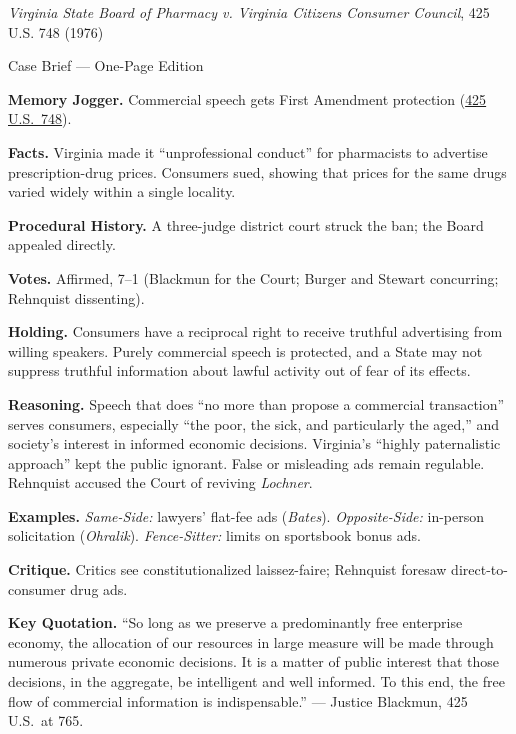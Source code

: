 \documentclass[12pt]{article}
\begin{document}
\begin{center}
{\Large \textit{Virginia State Board of Pharmacy v. Virginia Citizens Consumer Council}, 425 U.S. 748 (1976)\par}
\vspace{0.3em}
{\normalsize Case Brief --- One-Page Edition\par}
\end{center}

\textbf{Memory Jogger.} Commercial speech gets First Amendment protection (\href{https://supreme.justia.com/cases/federal/us/425/748/}{425 U.S.\ 748}).

\textbf{Facts.} Virginia made it ``unprofessional conduct'' for pharmacists to advertise prescription-drug prices. Consumers sued, showing that prices for the same drugs varied widely within a single locality.

\textbf{Procedural History.} A three-judge district court struck the ban; the Board appealed directly.

\textbf{Votes.} Affirmed, 7--1 (Blackmun for the Court; Burger and Stewart concurring; Rehnquist dissenting).

\textbf{Holding.} Consumers have a reciprocal right to receive truthful advertising from willing speakers. Purely commercial speech is protected, and a State may not suppress truthful information about lawful activity out of fear of its effects.

\textbf{Reasoning.} Speech that does ``no more than propose a commercial transaction'' serves consumers, especially ``the poor, the sick, and particularly the aged,'' and society's interest in informed economic decisions. Virginia's ``highly paternalistic approach'' kept the public ignorant. False or misleading ads remain regulable. Rehnquist accused the Court of reviving \textit{Lochner}.

\textbf{Examples.} \emph{Same-Side:} lawyers' flat-fee ads (\textit{Bates}). \emph{Opposite-Side:} in-person solicitation (\textit{Ohralik}). \emph{Fence-Sitter:} limits on sportsbook bonus ads.

\textbf{Critique.} Critics see constitutionalized laissez-faire; Rehnquist foresaw direct-to-consumer drug ads.

\textbf{Key Quotation.} ``So long as we preserve a predominantly free enterprise economy, the allocation of our resources in large measure will be made through numerous private economic decisions. It is a matter of public interest that those decisions, in the aggregate, be intelligent and well informed. To this end, the free flow of commercial information is indispensable.'' --- Justice Blackmun, 425 U.S.\ at 765.
\end{document}
